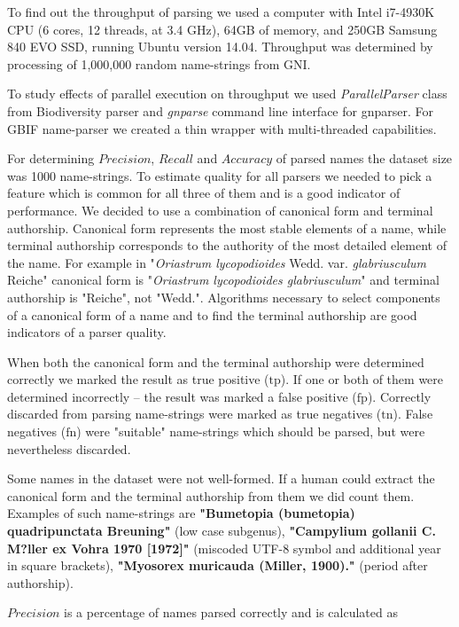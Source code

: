 \documentclass{bmcart}
\begin{document}
To find out the throughput of parsing we used a computer with Intel i7-4930K
CPU (6 cores, 12 threads, at 3.4 GHz), 64GB of memory, and 250GB Samsung 840
EVO SSD, running Ubuntu version 14.04. Throughput was determined by processing
of 1,000,000 random name-strings from GNI.

To study effects of parallel execution on throughput we used
\textit{ParallelParser} class from Biodiversity parser and \textit{gnparse}
command line interface for gnparser. For GBIF name-parser we created a thin
wrapper with multi-threaded capabilities\cite{gbifparser}.

For determining $Precision$, $Recall$ and $Accuracy$ of parsed names the
dataset size was 1000 name-strings. To estimate quality for all parsers we
needed to pick a feature which is common for all three of them and is a good
indicator of performance.  We decided to use a combination of canonical form
and terminal authorship.  Canonical form represents the most stable elements
of a name, while terminal authorship corresponds to the authority of the most
detailed element of the name. For example in "\textit{Oriastrum lycopodioides}
Wedd.  var.  \textit{glabriusculum} Reiche" canonical form is
"\textit{Oriastrum lycopodioides glabriusculum}" and terminal authorship is
"Reiche", not "Wedd.".  Algorithms necessary to select components of a
canonical form of a name and to find the terminal authorship are good
indicators of a parser quality.

When both the canonical form and the terminal authorship were determined
correctly we marked the result as true positive ($\text{tp}$).  If one or both
of them were determined incorrectly -- the result was marked a false positive
($\text{fp}$). Correctly discarded from parsing name-strings were marked as
true negatives ($\text{tn}$). False negatives ($\text{fn}$) were "suitable"
name-strings which should be parsed, but were nevertheless discarded.

Some names in the dataset were not well-formed. If a human could extract the
canonical form and the terminal authorship from them we did count them.
Examples of such name-strings are \textbf{"Bumetopia (bumetopia)
quadripunctata Breuning"} (low case subgenus), \textbf{"Campylium gollanii C.
M?ller ex Vohra 1970 [1972]"} (miscoded UTF-8 symbol and additional year in
square brackets), \textbf{"Myosorex muricauda (Miller, 1900)."} (period after
authorship).

$Precision$ is a percentage of names parsed correctly and is calculated as
\end{document}
